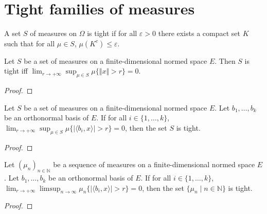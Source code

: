 \chapter{Tight families of measures}

\begin{definition}\label{def:tight}
 \mathlibok
A set $S$ of measures on $\Omega$ is tight if for all $\varepsilon > 0$ there exists a compact set $K$ such that for all $\mu \in S$, $\mu(K^c) \le \varepsilon$.
\end{definition}


\begin{lemma}\label{lem:isTightMeasureSet_iff_norm}
\leanok
{}
Let $S$ be a set of measures on a finite-dimensional normed space $E$. 
Then $S$ is tight iff $\lim_{r \to +\infty}\sup_{\mu \in S} \mu\{\Vert x \Vert > r\} = 0$.
\end{lemma}

\begin{proof}\leanok

\end{proof}
	

\begin{lemma}\label{lem:isTightMeasureSet_of_sup_basis}
\leanok
{}
Let $S$ be a set of measures on a finite-dimensional normed space $E$. 
Let $b_1, \ldots, b_k$ be an orthonormal basis of $E$.
If for all $i \in \{1, \ldots, k\}$, $\lim_{r \to +\infty}\sup_{\mu \in S} \mu\{\vert\langle b_i, x\rangle\vert > r\} = 0$, then the set $S$ is tight.
\end{lemma}

\begin{proof}\leanok
{}
\end{proof}


\begin{lemma}\label{lem:isTightMeasureSet_of_basis}
\leanok
{}
Let $(\mu_n)_{n \in \mathbb{N}}$ be a sequence of measures on a finite-dimensional normed space $E$. 
Let $b_1, \ldots, b_k$ be an orthonormal basis of $E$.
If for all $i \in \{1, \ldots, k\}$, $\lim_{r \to +\infty}\limsup_{n \to \infty} \mu_n\{\vert\langle b_i, x\rangle\vert > r\} = 0$, then the set $\{\mu_n \mid n \in \mathbb{N}\}$ is tight.
\end{lemma}

\begin{proof}\leanok
{}
\end{proof}


